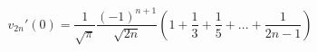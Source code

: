 \begin{equation}
v_{2n}'(0)=\frac{1}{\sqrt{\pi}}\frac{(-1)^{n+1}}{\sqrt{2n}}
\left(1+\frac{1}{3}+\frac{1}{5}+
...+\frac{1}{2n-1}\right)\label{eq:v'}\end{equation} 
